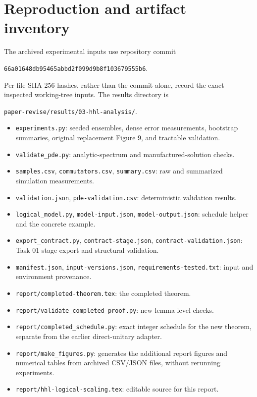 \documentclass[11pt,a4paper]{article}
\begin{document}
\section{Reproduction and artifact inventory}
The archived experimental inputs use repository commit
\begin{center}\texttt{66a01648db95465abbd2f099d9b8f103679555b6}.\end{center}
Per-file SHA-256 hashes, rather than the commit alone, record the exact inspected working-tree inputs. The results directory is
\begin{center}\texttt{paper-revise/results/03-hhl-analysis/}.\end{center}
\begin{itemize}
\item \texttt{experiments.py}: seeded ensembles, dense error measurements, bootstrap summaries, original replacement Figure 9, and tractable validation.
\item \texttt{validate\_pde.py}: analytic-spectrum and manufactured-solution checks.
\item \texttt{samples.csv}, \texttt{commutators.csv}, \texttt{summary.csv}: raw and summarized simulation measurements.
\item \texttt{validation.json}, \texttt{pde-validation.csv}: deterministic validation results.
\item \texttt{logical\_model.py}, \texttt{model-input.json}, \texttt{model-output.json}: schedule helper and the concrete example.
\item \texttt{export\_contract.py}, \texttt{contract-stage.json}, \texttt{contract-validation.json}: Task 01 stage export and structural validation.
\item \texttt{manifest.json}, \texttt{input-versions.json}, \texttt{requirements-tested.txt}: input and environment provenance.
\item \texttt{report/completed-theorem.tex}: the completed theorem.
\item \texttt{report/validate\_completed\_proof.py}: new lemma-level checks.
\item \texttt{report/completed\_schedule.py}: exact integer schedule for the new theorem, separate from the earlier direct-unitary adapter.
\item \texttt{report/make\_figures.py}: generates the additional report figures and numerical tables from archived CSV/JSON files, without rerunning experiments.
\item \texttt{report/hhl-logical-scaling.tex}: editable source for this report.
\end{itemize}
\end{document}
